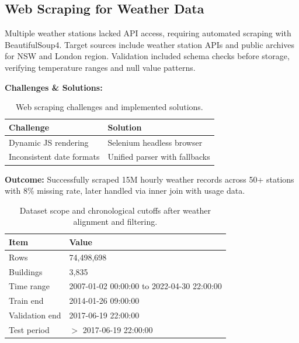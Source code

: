 \documentclass[11pt,a4paper]{article}
\begin{document}
\subsection{Web Scraping for Weather Data}
Multiple weather stations lacked API access, requiring automated scraping with BeautifulSoup4. Target sources include weather station APIs and public archives for NSW and London region. Validation included schema checks before storage, verifying temperature ranges and null value patterns.

\textbf{Challenges \& Solutions:}
\begin{table}[H]
\centering
\begin{tabular}{ll}
\hline
Challenge & Solution \\
\hline
Dynamic JS rendering & Selenium headless browser \\
Inconsistent date formats & Unified parser with fallbacks \\
\hline
\end{tabular}
\caption{Web scraping challenges and implemented solutions.}
\end{table}

\textbf{Outcome:} Successfully scraped 15M hourly weather records across 50+ stations with 8\% missing rate, later handled via inner join with usage data.

\begin{table}[H]
  \centering
  \begin{tabular}{ll}
    \hline
    Item & Value \\ \hline
    Rows & 74,498,698 \\
    Buildings & 3,835 \\
    Time range & 2007-01-02 00:00:00 to 2022-04-30 22:00:00 \\
    Train end & 2014-01-26 09:00:00 \\
    Validation end & 2017-06-19 22:00:00 \\
    Test period & $>$ 2017-06-19 22:00:00 \\
    \hline
  \end{tabular}
  \caption{Dataset scope and chronological cutoffs after weather alignment and filtering.}
\end{table}
\end{document}
